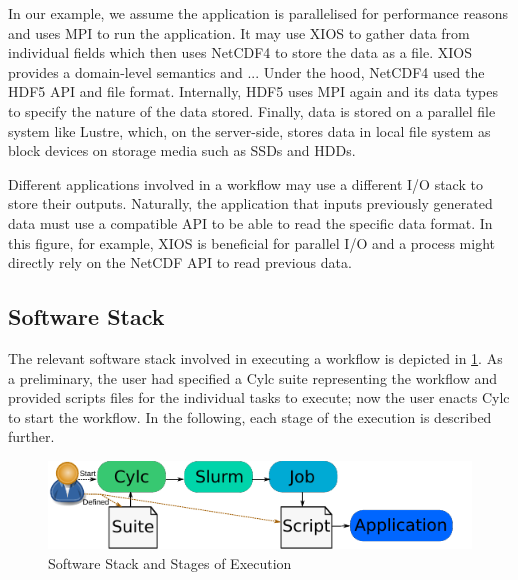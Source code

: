 \documentclass[a4paper]{article}
\newcommand{\jk}[1]{\todo[inline]{JK: #1}}
\begin{document}
\begin{minipage}{0.7\textwidth}
In our example, we assume the application is parallelised for performance reasons and uses MPI to run the application.
It may use XIOS to gather data from individual fields which then uses NetCDF4 to store the data as a file.
XIOS provides a domain-level semantics and ...\jk{TODO}
Under the hood, NetCDF4 used the HDF5 API and file format.
Internally, HDF5 uses MPI again and its data types to specify the nature of the data stored.
Finally, data is stored on a parallel file system like Lustre, which, on the server-side, stores data in local file system as block devices on storage media such as SSDs and HDDs.

Different applications involved in a workflow may use a different I/O stack to store their outputs.
Naturally, the application that inputs previously generated data must use a compatible API to be able to read the specific data format.
In this figure, for example, XIOS is beneficial for parallel I/O and a process might directly rely on the NetCDF API to read previous data.
\end{minipage}



\subsection{Software Stack}

The relevant software stack involved in executing a workflow is depicted in \ref{fig:stages}.
As a preliminary, the user had specified a Cylc suite representing the workflow and provided scripts files for the individual tasks to execute; now the user enacts Cylc to start the workflow.
In the following, each stage of the execution is described further.

\begin{figure}[bt]
  \centering
  \includegraphics[scale=1.4]{stages}
  \caption{Software Stack and Stages of Execution}
  \label{fig:stages}
\end{figure}
\end{document}
